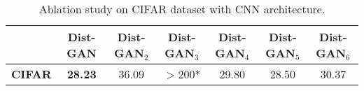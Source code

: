 \documentclass[runningheads]{llncs}
\begin{document}
\begin{table}
\centering
\scriptsize
\caption{Ablation study on CIFAR dataset with CNN architecture.}
\begin{tabular}{c | c | c | c | c | c | c }
\hline
 & \textbf{Dist-GAN} & \textbf{Dist-GAN$_2$}  & \textbf{Dist-GAN$_3$} & \textbf{Dist-GAN$_4$} & \textbf{Dist-GAN$_5$} & \textbf{Dist-GAN$_6$} \\
\hline
\textbf{CIFAR} & \textbf{28.23} & 36.09 & $>$200* & 29.80 & 28.50 & 30.37 \\
\end{tabular}
\label{fid_score_ablation}
\end{table}
 
\end{document}
